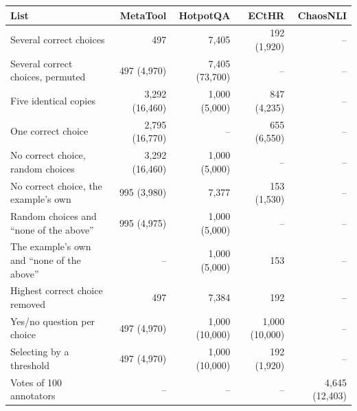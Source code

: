 \begin{tabular}{lrrrr}
\toprule
List & MetaTool & HotpotQA & ECtHR & ChaosNLI \\
\midrule
Several correct choices & 497 & 7,405 & 192 (1,920) & -- \\
Several correct choices, permuted & 497 (4,970) & 7,405 (73,700) & -- & -- \\
Five identical copies & 3,292 (16,460) & 1,000 (5,000) & 847 (4,235) & -- \\
One correct choice & 2,795 (16,770) & -- & 655 (6,550) & -- \\
No correct choice, random choices & 3,292 (16,460) & 1,000 (5,000) & -- & -- \\
No correct choice, the example's own & 995 (3,980) & 7,377 & 153 (1,530) & -- \\
Random choices and ``none of the above'' & 995 (4,975) & 1,000 (5,000) & -- & -- \\
The example's own and ``none of the above'' & -- & 1,000 (5,000) & 153 & -- \\
Highest correct choice removed & 497 & 7,384 & 192 & -- \\
Yes/no question per choice & 497 (4,970) & 1,000 (10,000) & 1,000 (10,000) & -- \\
Selecting by a threshold & 497 (4,970) & 1,000 (10,000) & 192 (1,920) & -- \\
Votes of 100 annotators & -- & -- & -- & 4,645 (12,403) \\
\bottomrule
\end{tabular}%
